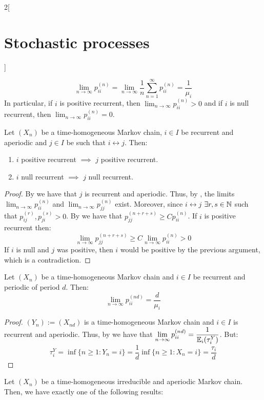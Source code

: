 \documentclass[../../../main_math.tex]{subfiles}
\begin{document}
\begin{multicols}{2}[\section{Stochastic processes}]
\begin{theorem}
    $$
      \lim_{n\to\infty}p_{ii}^{(n)}=\lim_{n\to\infty}\frac{1}{n}\sum_{n=1}^\infty p_{ii}^{(n)}=\frac{1}{\mu_i}
    $$
    In particular, if $i$ is positive recurrent, then $\displaystyle\lim_{n\to\infty}p_{ii}^{(n)}>0$ and if $i$ is null recurrent, then $\displaystyle\lim_{n\to\infty}p_{ii}^{(n)}=0$.
  \end{theorem}
  \begin{proposition}
    Let $(X_n)$ be a time-homogeneous Markov chain, $i\in I$ be recurrent and aperiodic and $j\in I$ be such that $i\leftrightarrow j$. Then:
    \begin{enumerate}
      \item $i$ positive recurrent $\implies$ $j$ positive recurrent.
      \item $i$ null recurrent $\implies$ $j$ null recurrent.
    \end{enumerate}
  \end{proposition}
  \begin{proof}
    By  we have that $j$ is recurrent and aperiodic. Thus, by , the limits $\displaystyle \lim_{n\to\infty}p_{ii}^{(n)}$ and $\displaystyle \lim_{n\to\infty}p_{jj}^{(n)}$ exist. Moreover, since $i\leftrightarrow j$ $\exists r,s\in\mathbb{N}$ such that $p_{ij}^{(r)}, p_{ji}^{(s)}>0$. By  we have that $p_{jj}^{(n+r+s)}\geq C p_{ii}^{(n)}$. If $i$ is positive recurrent then:
    $$
      \lim_{n\to\infty}p_{jj}^{(n+r+s)}\geq C\lim_{n\to\infty}p_{ii}^{(n)}>0
    $$
    If $i$ is null and $j$ was positive, then $i$ would be positive by the previous argument, which is a contradiction.
  \end{proof}
  \begin{theorem}
    Let $(X_n)$ be a time-homogeneous Markov chain and $i\in I$ be recurrent and periodic of period $d$. Then:
    $$
      \lim_{n\to\infty} p_{ii}^{(nd)}=\frac{d}{\mu_i}
    $$
  \end{theorem}
  \begin{proof}
    $(Y_n):=(X_{nd})$ is a time-homogeneous Markov chain and $i\in I$ is recurrent and aperiodic. Thus, by  we have that $\displaystyle\lim_{n\to\infty}p_{ii}^{(nd)}=\frac{1}{\mathbb{E}_i(\tau_i^Y)}$. But:
    $$
      \tau_i^Y=\inf\{ n\geq 1: Y_n=i\}=\frac{1}{d}\inf\{n\geq 1: X_{n}=i\}=\frac{\tau_i}{d}
    $$
  \end{proof}
  \begin{theorem}
    Let $(X_n)$ be a time-homogeneous irreducible and aperiodic Markov chain. Then, we have exactly one of the following results:

\end{theorem}
\end{multicols}
\end{document}
